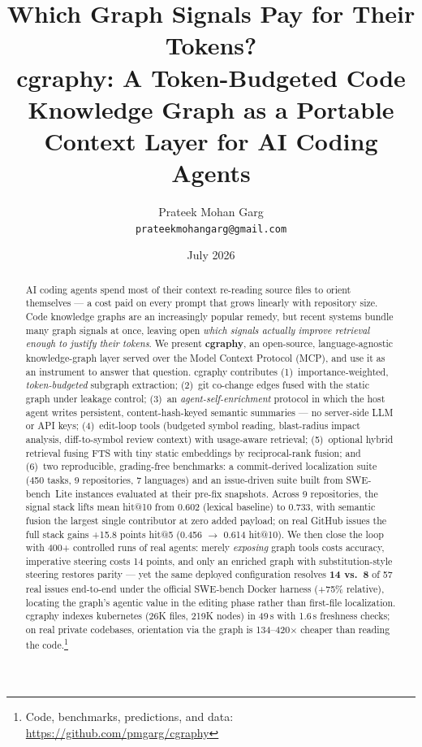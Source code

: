\documentclass[11pt]{article}
\title{Which Graph Signals Pay for Their Tokens?\\
\large cgraphy: A Token-Budgeted Code Knowledge Graph as a Portable
Context Layer for AI Coding Agents}
\author{Prateek Mohan Garg\\
\small\texttt{prateekmohangarg@gmail.com}}
\date{July 2026}
\begin{document}
\maketitle

\begin{abstract}
AI coding agents spend most of their context re-reading source files to
orient themselves --- a cost paid on every prompt that grows linearly with
repository size. Code knowledge graphs are an increasingly popular remedy,
but recent systems bundle many graph signals at once, leaving open
\emph{which signals actually improve retrieval enough to justify their
tokens}. We present \textbf{cgraphy}, an open-source, language-agnostic
knowledge-graph layer served over the Model Context Protocol (MCP), and use
it as an instrument to answer that question. cgraphy contributes
(1)~importance-weighted, \emph{token-budgeted} subgraph extraction;
(2)~git co-change edges fused with the static graph under leakage control;
(3)~an \emph{agent-self-enrichment} protocol in which the host agent writes
persistent, content-hash-keyed semantic summaries --- no server-side LLM or
API keys; (4)~edit-loop tools (budgeted symbol reading, blast-radius
impact analysis, diff-to-symbol review context) with usage-aware retrieval;
(5)~optional hybrid retrieval fusing FTS with tiny static embeddings by
reciprocal-rank fusion; and (6)~two reproducible, grading-free benchmarks:
a commit-derived localization suite (450 tasks, 9 repositories,
7 languages) and an issue-driven suite built from SWE-bench~Lite instances
evaluated at their pre-fix snapshots. Across 9 repositories, the signal
stack lifts mean hit@10 from 0.602 (lexical baseline) to 0.733, with
semantic fusion the largest single contributor at zero added payload; on
real GitHub issues the full stack gains +15.8 points hit@5
(0.456 $\rightarrow$ 0.614 hit@10). We then close the loop with 400+
controlled runs of real agents: merely \emph{exposing} graph tools costs
accuracy, imperative steering costs 14 points, and only an enriched graph
with substitution-style steering restores parity --- yet the same deployed
configuration resolves \textbf{14 vs.\ 8} of 57 real issues end-to-end
under the official SWE-bench Docker harness (+75\% relative), locating the
graph's agentic value in the editing phase rather than first-file
localization. cgraphy indexes kubernetes (26K files, 219K nodes) in 49\,s
with 1.6\,s freshness checks; on real private codebases, orientation via
the graph is 134--420$\times$ cheaper than reading the code.\footnote{Code,
benchmarks, predictions, and data: \url{https://github.com/pmgarg/cgraphy}}
\end{abstract}
\end{document}
